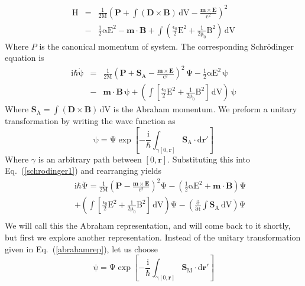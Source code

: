 \documentclass[twocolumn,english,pra,aps,superscriptaddress,floatfix]{revtex4-1}
\begin{document}
\begin{eqnarray}
\mathrm{H}&=&\mathrm{\frac{1}{2M}\left(\mathbf{P}+\int\left(\mathbf{D}\times\mathbf{B}\right)\,dV-\frac{\mathbf{m}\times\mathbf{E}}{c^2}\right)^2} \nonumber \\
&-&\mathrm{\frac{1}{2}\alpha E^2-\mathbf{m}\cdot\mathbf{B}+\int\left(\frac{\epsilon_0}{2}E^2+ \frac{1}{2\mu_0}B^2\right)\,dV}
\label{hamiltonian1}
\end{eqnarray}
Where $P$ is the canonical momentum of system. The corresponding Schr\"{o}dinger equation is 
\begin{eqnarray}
\mathrm{i\hbar\dot{\psi}}&=&\mathrm{\frac{1}{2M}\left(\mathbf{P}+ \mathbf{S}_A-\frac{\mathbf{m}\times\mathbf{E}}{c^2}\right)^2\,\Psi-\frac{1}{2}\alpha E^2\,\psi}\nonumber \\
&-&\mathrm{\mathbf{m}\cdot\mathbf{B}\,\psi+\left(\int\left[\frac{\epsilon_0}{2}E^2+ \frac{1}{2\mu_0}B^2\right]\,dV\right)\,\psi}
\label{schrodinger1}
\end{eqnarray}
Where $\mathrm{\mathbf{S}_A=\int \left(\mathbf{D}\times\mathbf{B}\right) \, dV}$ is the Abraham momentum.  We preform a unitary transformation by writing the wave function as
\begin{equation}
\mathrm{\psi=\Psi\exp{\left[-\frac{\mathrm{i}}{\mathrm{\hbar}}\int_{\gamma[0,\mathbf{r}]}\mathbf{S}_A\cdot d\mathbf{r}'\right]}}
\label{abrahamrep}
\end{equation}
Where $\gamma$ is an arbitrary path between $[0,\mathbf{r}]$. Substituting this into Eq.\ (\ref{schrodinger1}) and rearranging yields
\begin{eqnarray}
&&\mathrm{i\hbar\dot{\Psi}=\frac{1}{2M}\left(\mathbf{P}-\frac{\mathbf{m}\times\mathbf{E}}{c^2}\right)^2\Psi-\left(\frac{1}{2}\alpha E^2+\mathbf{m}\cdot\mathbf{B}\right)\Psi} \nonumber \\
&&\mathrm{+\left(\int\left[\frac{\epsilon_0}{2}E^2+\frac{1}{2\mu_0}B^2\right]\,dV\right)\Psi-\left(\frac{\partial}{\partial t}\int \mathbf{S}_A\,\mathrm{dV}\right)\Psi} \nonumber \\
\label{schrodinger2}
\end{eqnarray}
We will call this the Abraham representation, and will come back to it shortly, but first we explore another representation. Instead of the unitary transformation given in Eq.\ (\ref{abrahamrep}), let us choose
\begin{equation}
\mathrm{\psi=\Psi\exp{\left[-\frac{\mathrm{i}}{\mathrm{\hbar}}\int_{\gamma[0,\mathbf{r}]}\mathbf{S}_M\cdot d\mathbf{r}'\right]}}
\label{directrep}
\end{equation}
\end{document}
